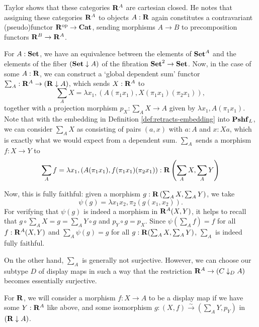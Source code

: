 Taylor shows that these categories $ \mathbf{R}^A $ are cartesian closed. He notes that assigning these categories $ \mathbf{R}^A $ to objects $ A: \mathbf{R} $ again constitutes a contravariant (pseudo)functor $ \mathbf{R}^{\text{op}} \to \mathbf{Cat} $, sending morphisms $ A \to B $ to precomposition functors $ \mathbf{R}^B \to \mathbf{R}^A $.

For $ A: \mathbf{Set} $, we have an equivalence between the elements of $ \mathbf{Set}^A $ and the elements of the fiber $ (\mathbf{Set} \downarrow A) $ of the fibration $ \mathbf{Set}^2 \to \mathbf{Set} $. Now, in the case of some $ A: \mathbf{R} $, we can construct a `global dependent sum' functor $ \sum_A : \mathbf{R}^A \to (\mathbf{R} \downarrow A) $, which sends $ X: \mathbf{R}^A $ to
\[ \sum_A X = \lambda x_1, (A (\pi_1 x_1), X (\pi_1 x_1) (\pi_2 x_1)), \]
together with a projection morphism $ p_X: \sum_A X \to A $ given by $ \lambda x_1, A(\pi_1 x_1) $. Note that with the embedding in Definition \ref{def:retracts-embedding} into $ \mathbf{Pshf}_{L} $, we can consider $ \sum_A X $ as consisting of pairs $ (a, x) $ with $ a : A $ and $ x : X a $, which is exactly what we would expect from a dependent sum. $ \sum_A $ sends a morphism $ f: X \to Y $ to
\[ \sum_A f = \lambda x_1, ( A (\pi_1 x_1), f (\pi_1 x_1) (\pi_2 x_1) ) : \mathbf{R}\left(\sum_A X, \sum_A Y\right) \]

Now, this is fully faithful: given a morphism $ g: \mathbf{R}\left(\sum_A X, \sum_A Y\right) $, we take
\[ \psi(g) = \lambda x_1 x_2, \pi_2 (g (x_1, x_2)). \]
For verifying that $ \psi(g) $ is indeed a morphism in $ \mathbf{R}^A(X, Y) $, it helps to recall that $ g \circ \sum_A X = g = \sum_A Y \circ g $ and $ p_Y \circ g = p_X $. Since $ \psi(\sum_A f) = f $ for all $ f: \mathbf{R}^A(X, Y) $ and $ \sum_A \psi(g) = g $ for all $ g: \mathbf{R}(\sum_A X, \sum_A Y) $, $ \sum_A $ is indeed fully faithful.

On the other hand, $ \sum_A $ is generally not surjective. However, we can choose our subtype $ D $ of display maps in such a way that the restriction $ \mathbf{R}^A \to (C \downarrow_D A) $ becomes essentially surjective.

\begin{definition}
  For $ \mathbf{R} $, we will consider a morphism $ f: X \to A $ to be a display map if we have some $ Y : \mathbf{R}^A $ like above, and some isomorphism $ g: (X, f) \xrightarrow{\sim} (\sum_A Y, p_Y) $ in $ (\mathbf{R} \downarrow A) $.
\end{definition}

